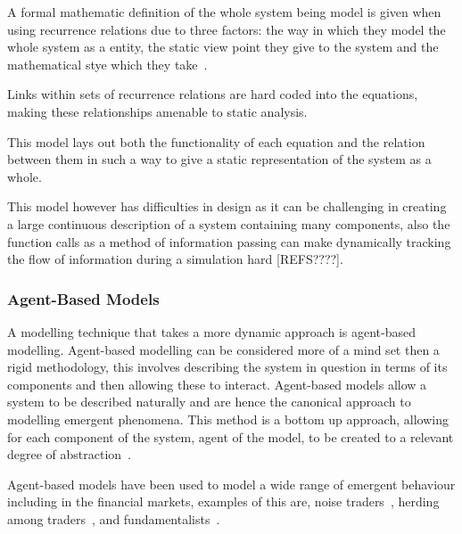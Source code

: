 \documentclass{article}
\begin{document}
A formal mathematic definition of the whole system being model is given when using recurrence relations due to three factors: the way in which they model the whole system as a entity, the static view point they give to the system and the mathematical stye which they take~\cite{rrformulism}.  %

Links within sets of recurrence relations are hard coded into the equations, making these relationships amenable to static analysis.      

This model lays out both the functionality of each equation and the relation between them in such a way to give a static representation of the system as a whole. 

This model however has difficulties in design as it can be challenging in creating a large continuous description of a system containing many components, also the function calls as a method of information passing can make dynamically tracking the flow of information during a simulation hard [REFS????].   


\subsubsection{Agent-Based Models}
A modelling technique that takes a more dynamic approach is agent-based modelling. Agent-based modelling can be considered more of a mind set then a rigid methodology, this involves describing the system in question in terms of its components and then allowing these to interact. Agent-based models allow a system to be described naturally and are hence the canonical approach to modelling emergent phenomena. This method is a bottom up approach, allowing for each component of the system, agent of the model, to be created to a relevant degree of abstraction~\cite{abmhumsystems}.

Agent-based models have been used to model a wide range of emergent behaviour including in the financial markets, examples of this are, noise traders~\cite{abmnoisetraders}, herding among traders~\cite{abmherding}, and fundamentalists~\cite{abmfundemetilists}.
\end{document}
